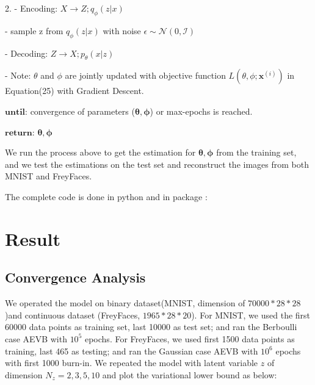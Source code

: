 \documentclass[11pt]{article}
\begin{document}
2. - Encoding: $X\to Z; q_{\phi}(z|x)$ 

   \quad - sample z from $q_{\phi}(z|x)$ with noise $\epsilon \sim \mathcal{N}(0,\mathcal{I})$ 
   
   \quad - Decoding: $Z\to X; p_{\theta}(x|z) $ 
   
   \quad - Note: $\theta$ and $\phi$ are jointly updated with objective function $L(\theta, \phi; \mathbf{x}^{(i)})$ in Equation(25) with Gradient Descent.

$\textbf{until}$: convergence of parameters ($\mathbf{\theta, \phi}$) or max-epochs is reached.

$\textbf{return}$: $\mathbf{\theta, \phi}$

We run the process above to get the estimation for $\mathbf{\theta, \phi}$ from the training set, and we test the estimations on the test set and reconstruct the images from both MNIST and FreyFaces. 

The complete code is done in python and in package : 


\section{Result}
\subsection{Convergence Analysis}
We operated the model on binary dataset(MNIST, dimension of $70000*28*28$)and continuous dataset (FreyFaces, $1965*28*20$). For MNIST, we used the first 60000 data points as training set, last 10000 as test set; and ran the Berboulli case AEVB with $10^5$ epochs. For FreyFaces, we used first 1500 data points as training, last 465 as testing; and ran  the Gaussian case AEVB with $10^6$ epochs with first 1000 burn-in. We repeated the model with latent variable $z$ of dimension $N_z= 2,3,5,10$ and plot the variational lower bound as below:
\end{document}
